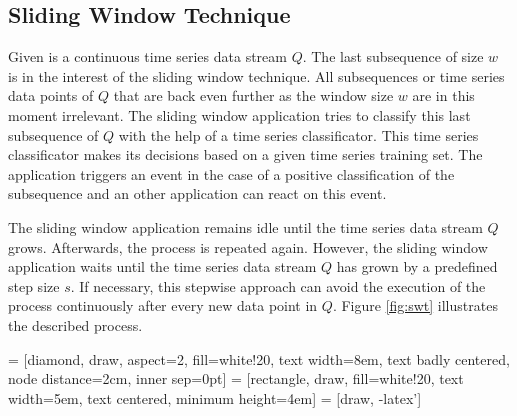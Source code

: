 \subsection{Sliding Window Technique} \label{sliding_window_technique}
Given is a continuous time series data stream $Q$. The last subsequence of size $w$ is in the interest of the sliding
window technique. All subsequences or time series data points of $Q$ that are back even further as the window size $w$
are in this moment irrelevant. The sliding window application tries to classify this last subsequence of $Q$ with the
help of a time series classificator. This time series classificator makes its decisions based on a given time series
training set. The application triggers an event in the case of a positive classification of the subsequence and an other
application can react on this event.

The sliding window application remains idle until the time series data stream $Q$
grows. Afterwards, the process is repeated again. However, the sliding window application waits until the time series
data stream $Q$ has grown by a predefined step size $s$. If necessary, this stepwise approach can avoid the execution of
the process continuously after every new data point in $Q$. Figure \ref{fig:swt} illustrates the described process.

 = [diamond, draw, aspect=2, fill=white!20, text width=8em, text badly centered, node distance=2cm, inner sep=0pt]
 = [rectangle, draw, fill=white!20, text width=5em, text centered, minimum height=4em]
 = [draw, -latex']

